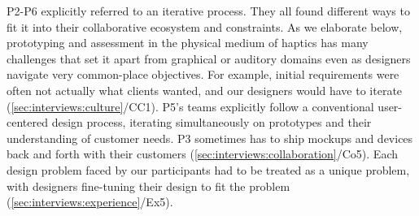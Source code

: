 P2-P6 explicitly referred to an iterative process. They all found different ways to fit it into their collaborative ecosystem and constraints.
As we elaborate below, prototyping and assessment in the physical medium of haptics has many challenges that set it apart from graphical or auditory domains even as designers navigate very common-place objectives. For example,
initial requirements were often not actually what clients wanted, and our designers would have to iterate (\ref{sec:interviews:culture}/CC1).
P5's teams explicitly follow a conventional user-centered design process, iterating simultaneously on prototypes and their understanding of customer needs.
P3 sometimes has to ship mockups and devices back and forth with their customers (\ref{sec:interviews:collaboration}/Co5).
Each design problem faced by our participants had to be treated as a unique problem, with designers fine-tuning their design to fit the problem (\ref{sec:interviews:experience}/Ex5).
%
